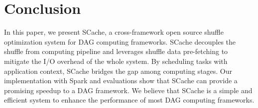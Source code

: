 \section{Conclusion}
 In this paper, we present SCache, a cross-framework open source shuffle optimization system for DAG computing frameworks. SCache decouples the shuffle from computing pipeline and leverages shuffle data pre-fetching to mitigate the I/O overhead of the whole system. By scheduling tasks with application context, SCache bridges the gap among computing stages. Our implementation with Spark and evaluations show that SCache can provide a promising speedup to a DAG framework. We believe that SCache is a simple and efficient system to enhance the performance of most DAG computing frameworks. 